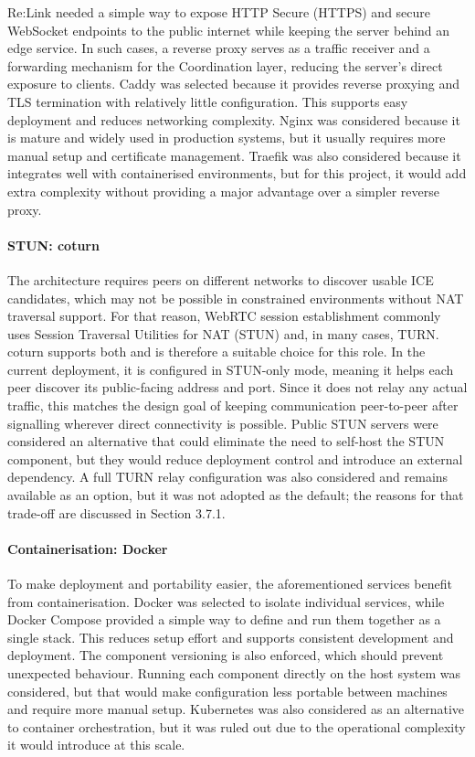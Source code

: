 \documentclass[12pt,a4paper]{article}
\begin{document}
Re:Link needed a simple way to expose HTTP Secure (HTTPS) and secure WebSocket endpoints to the public internet while keeping the server behind an edge service. In such cases, a reverse proxy serves as a traffic receiver and a forwarding mechanism for the Coordination layer, reducing the server’s direct exposure to clients. Caddy was selected because it provides reverse proxying and TLS termination with relatively little configuration. This supports easy deployment and reduces networking complexity. Nginx \cite{nginx} was considered because it is mature and widely used in production systems, but it usually requires more manual setup and certificate management. Traefik \cite{traefik} was also considered because it integrates well with containerised environments, but for this project, it would add extra complexity without providing a major advantage over a simpler reverse proxy.

\paragraph{STUN: coturn}

The architecture requires peers on different networks to discover usable ICE candidates, which may not be possible in constrained environments without NAT traversal support. For that reason, WebRTC session establishment commonly uses Session Traversal Utilities for NAT (STUN) and, in many cases, TURN. coturn \cite{coturn} supports both and is therefore a suitable choice for this role. In the current deployment, it is configured in STUN-only mode, meaning it helps each peer discover its public-facing address and port. Since it does not relay any actual traffic, this matches the design goal of keeping communication peer-to-peer after signalling wherever direct connectivity is possible. Public STUN servers were considered an alternative that could eliminate the need to self-host the STUN component, but they would reduce deployment control and introduce an external dependency. A full TURN relay configuration was also considered and remains available as an option, but it was not adopted as the default; the reasons for that trade-off are discussed in Section 3.7.1.

\paragraph{Containerisation: Docker}

To make deployment and portability easier, the aforementioned services benefit from containerisation. Docker was selected to isolate individual services, while Docker Compose provided a simple way to define and run them together as a single stack. This reduces setup effort and supports consistent development and deployment. The component versioning is also enforced, which should prevent unexpected behaviour. Running each component directly on the host system was considered, but that would make configuration less portable between machines and require more manual setup. Kubernetes \cite{kubernetes} was also considered as an alternative to container orchestration, but it was ruled out due to the operational complexity it would introduce at this scale.
\end{document}
